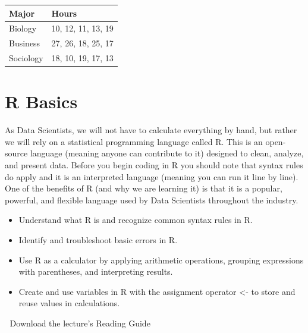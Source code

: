 \documentclass[
  letterpaper,
  DIV=11,
  numbers=noendperiod]{scrreprt}
\providecommand{\tightlist}{%
  \setlength{\itemsep}{0pt}\setlength{\parskip}{0pt}}
\begin{document}
\begin{longtable}[]{@{}ll@{}}
\toprule\noalign{}
Major & Hours \\
\midrule\noalign{}
\endhead
\bottomrule\noalign{}
\endlastfoot
Biology & 10, 12, 11, 13, 19 \\
Business & 27, 26, 18, 25, 17 \\
Sociology & 18, 10, 19, 17, 13 \\
\end{longtable}


\chapter{R Basics}\label{r-basics}

As Data Scientists, we will not have to calculate everything by hand,
but rather we will rely on a statistical programming language called R.
This is an open-source language (meaning anyone can contribute to it)
designed to clean, analyze, and present data. Before you begin coding in
R you should note that syntax rules do apply and it is an interpreted
language (meaning you can run it line by line). One of the benefits of R
(and why we are learning it) is that it is a popular, powerful, and
flexible language used by Data Scientists throughout the industry.

\begin{itemize}
\tightlist
\item
  Understand what R is and recognize common syntax rules in R.
\item
  Identify and troubleshoot basic errors in R.
\item
  Use R as a calculator by applying arithmetic operations, grouping
  expressions with parentheses, and interpreting results.
\item
  Create and use variables in R with the assignment operator \textless-
  to store and reuse values in calculations.
\end{itemize}

\begin{tcolorbox}[enhanced jigsaw, colbacktitle=quarto-callout-tip-color!10!white, breakable, bottomrule=.15mm, colframe=quarto-callout-tip-color-frame, left=2mm, opacitybacktitle=0.6, title=\textcolor{quarto-callout-tip-color}{\faLightbulb}\hspace{0.5em}{Supplemental Material}, leftrule=.75mm, opacityback=0, rightrule=.15mm, titlerule=0mm, bottomtitle=1mm, colback=white, toprule=.15mm, arc=.35mm, toptitle=1mm, coltitle=black]

📄 Download the lecture's Reading Guide

\end{tcolorbox}
\end{document}
